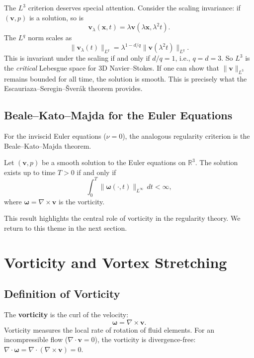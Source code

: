 The $L^3$ criterion deserves special attention. Consider the scaling invariance: if $(\mathbf{v}, p)$ is a solution, so is
\[
\mathbf{v}_\lambda(\mathbf{x}, t) = \lambda \mathbf{v}(\lambda \mathbf{x}, \lambda^2 t).
\]
The $L^q$ norm scales as
\[
\|\mathbf{v}_\lambda(t)\|_{L^q} = \lambda^{1-d/q} \|\mathbf{v}(\lambda^2 t)\|_{L^q}.
\]
This is invariant under the scaling if and only if $d/q = 1$, i.e., $q = d = 3$. So $L^3$ is the \emph{critical} Lebesgue space for 3D Navier--Stokes. If one can show that $\|\mathbf{v}\|_{L^3}$ remains bounded for all time, the solution is smooth. This is precisely what the Escauriaza--Seregin--\v{S}ver\'{a}k theorem provides.

\subsection{Beale--Kato--Majda for the Euler Equations}

For the inviscid Euler equations ($\nu = 0$), the analogous regularity criterion is the Beale--Kato--Majda theorem.

\begin{theorem}
\label{thm:BKM}
Let $(\mathbf{v}, p)$ be a smooth solution to the Euler equations on $\mathbb{R}^3$. The solution exists up to time $T > 0$ if and only if
\[
\int_0^T \|\boldsymbol{\omega}(\cdot, t)\|_{L^\infty} \, dt < \infty,
\]
where $\boldsymbol{\omega} = \nabla \times \mathbf{v}$ is the vorticity.
\end{theorem}

This result highlights the central role of vorticity in the regularity theory. We return to this theme in the next section.

\section{Vorticity and Vortex Stretching}
\label{sec:NS-vorticity}

\subsection{Definition of Vorticity}

The \textbf{vorticity} is the curl of the velocity:
\[
\boldsymbol{\omega} = \nabla \times \mathbf{v}.
\]
Vorticity measures the local rate of rotation of fluid elements. For an incompressible flow ($\nabla \cdot \mathbf{v} = 0$), the vorticity is divergence-free: $\nabla \cdot \boldsymbol{\omega} = \nabla \cdot (\nabla \times \mathbf{v}) = 0$.

